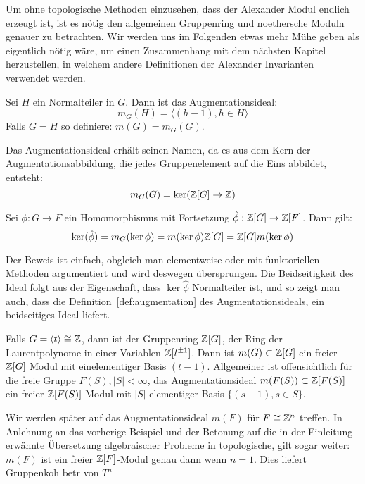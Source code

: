 Um ohne topologische Methoden einzusehen, dass der Alexander Modul endlich erzeugt ist, ist es nötig den allgemeinen Gruppenring und noethersche Moduln genauer zu betrachten. Wir werden uns im Folgenden etwas mehr Mühe geben als eigentlich nötig wäre, um einen Zusammenhang mit dem nächsten Kapitel herzustellen, in welchem andere Definitionen der Alexander Invarianten verwendet werden.

\begin{defn}[Augmentationsideal]
\label{def:augmentation}
	Sei $H$ ein Normalteiler in $G$. Dann ist das Augmentationsideal:
	\[
		m_G(H) = \langle (h-1), h\in H \rangle
	\]
	Falls $G=H$ so definiere: $m(G)=m_G(G)$.
\end{defn}

\begin{bem}
Das Augmentationsideal erhält seinen Namen, da es aus dem Kern der Augmentationsabbildung, die jedes Gruppenelement auf die Eins abbildet, entsteht:
\[
	m_G(G) = \ker(\mathbb{Z}[G] \to \mathbb{Z})
\]

\end{bem}
\begin{lem}
\label{lem:augmker}
	Sei $\phi:G \to F$ ein Homomorphismus mit Fortsetzung $\hat \phi: \mathbb{Z}[G] \to \mathbb{Z}[F]$. Dann gilt:
	\[
		\ker(\hat\phi) = m_G(\ker\phi)= m(\ker\phi) \mathbb{Z}[G] = \mathbb{Z}[G] m(\ker\phi) 
	\]
\end{lem}
Der Beweis ist einfach, obgleich man elementweise oder mit funktoriellen Methoden argumentiert und wird deswegen übersprungen. Die Beidseitigkeit des Ideal folgt aus der Eigenschaft, dass $\ker\hat\phi$ Normalteiler ist, und so zeigt man auch, dass die Definition~\ref{def:augmentation} des Augmentationsideals, ein beidseitiges Ideal liefert.


\begin{bsp}
	Falls $G=\langle t \rangle \cong \mathbb{Z}$, dann ist der Gruppenring $\mathbb{Z} [G]$, der Ring der Laurentpolynome in einer Variablen $\mathbb{Z}[t^{\pm 1}]$. Dann ist $m(G) \subset \mathbb{Z}[G]$ ein freier $\mathbb{Z}[G]$ Modul mit einelementiger Basis $(t-1)$. Allgemeiner ist offensichtlich für die freie Gruppe $F(S), |S| < \infty$, das Augmentationsideal $m(F(S)) \subset \mathbb{Z}[F(S)]$ ein freier $\mathbb{Z}[F(S)]$ Modul mit $|S|$-elementiger Basis $\{(s-1), s \in S\}$.
\end{bsp}

\begin{bsp}
	\label{ex:eilmaclane}
	Wir werden später auf das Augmentationsideal $m(F)$ für $F\cong \mathbb{Z}^n$ treffen. In Anlehnung an das vorherige Beispiel und der Betonung auf die in der Einleitung erwähnte Übersetzung algebraischer Probleme in topologische, gilt sogar weiter: $m(F)$ ist ein freier $\mathbb{Z}[F]$-Modul genau dann wenn $n=1$. Dies liefert Gruppenkoh betr von $T^n$ 
\end{bsp}




